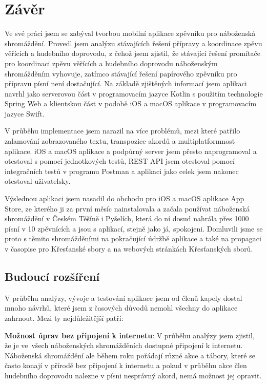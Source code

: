 \chapter*{Závěr}
\label{zaver}

Ve své práci jsem se zabýval tvorbou mobilní aplikace zpěvníku pro náboženská shromáždění. Provedl jsem analýzu stávajících řešení přípravy a koordinace zpěvu věřících a hudebního doprovodu, z čehož jsem zjistil, že stávající řešení promítače pro koordinaci zpěvu věřících a hudebního doprovodu náboženským shromážděním vyhovuje, zatímco stávající řešení papírového zpěvníku pro přípravu písní není dostačující. Na základě zjištěných informací jsem aplikaci navrhl jako serverovou část v programovacím jazyce Kotlin s použitím technologie Spring Web a klientskou část v podobě iOS a macOS aplikace v programovacím jazyce Swift.

V průběhu implementace jsem narazil na více problémů, mezi které patřilo zalamování zobrazovaného textu, transpozice akordů a multiplatformnost aplikace. iOS a macOS aplikace a podpůrný server jsem přesto naprogramoval a otestoval s pomocí jednotkových testů, REST API jsem otestoval pomocí integračních testů v programu Postman a aplikaci jako celek jsem nakonec otestoval uživatelsky.

Výslednou aplikaci jsem nasadil do obchodu pro iOS a macOS aplikace App Store, ze kterého ji za první měsíc nainstalovala a začala používat náboženská shromáždění v Českém Těšíně i Pyšelích, která do ní dosud nahrála přes 1000 písní v 10 zpěvnících a jsou s aplikací, stejně jako já, spokojeni. Domluvili jsme se proto s těmito shromážděními na pokračující údržbě aplikace a také na propagaci v časopise pro Křesťanské sbory a na webových stránkách Křesťanských sborů.

\section*{Budoucí rozšíření}

V průběhu analýzy, vývoje a testování aplikace jsem od členů kapely dostal mnoho návrhů, které jsem z časových důvodů nemohl všechny do aplikace zahrnout. Mezi ty nejdůležitější patří:

\textbf{Možnost úprav bez připojení k internetu}: V průběhu analýzy jsem zjistil, že je ve~všech náboženských shromážděních dostupné připojení k internetu. Náboženská shromáždění ale během roku pořádají různé akce a tábory, které se často konají v přírodě bez připojení k internetu a pokud v průběhu akce člen hudebního doprovodu nalezne v písni nesprávný akord, nemá možnost jej opravit.

